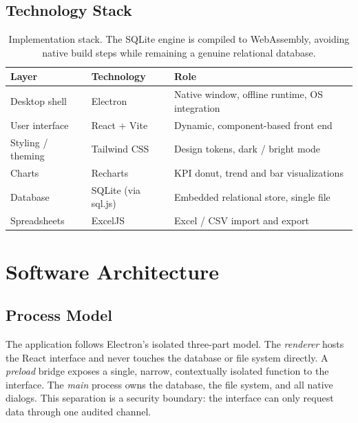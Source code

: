 \documentclass[11pt]{article}
\begin{document}
\subsection{Technology Stack}
\begin{table}[H]
\centering\small
\begin{tabular}{@{}l l l@{}}
\toprule
\textbf{Layer} & \textbf{Technology} & \textbf{Role} \\
\midrule
Desktop shell     & Electron              & Native window, offline runtime, OS integration \\
User interface    & React + Vite          & Dynamic, component-based front end \\
Styling / theming & Tailwind CSS          & Design tokens, dark / bright mode \\
Charts            & Recharts              & KPI donut, trend and bar visualizations \\
Database          & SQLite (via sql.js)   & Embedded relational store, single file \\
Spreadsheets      & ExcelJS               & Excel / CSV import and export \\
\bottomrule
\end{tabular}
\caption{Implementation stack. The SQLite engine is compiled to WebAssembly, avoiding native
build steps while remaining a genuine relational database.}
\end{table}

\section{Software Architecture}
\subsection{Process Model}
The application follows Electron's isolated three-part model. The \emph{renderer} hosts the React
interface and never touches the database or file system directly. A \emph{preload} bridge exposes a
single, narrow, contextually isolated function to the interface. The \emph{main} process owns the
database, the file system, and all native dialogs. This separation is a security boundary: the
interface can only request data through one audited channel.
\end{document}
